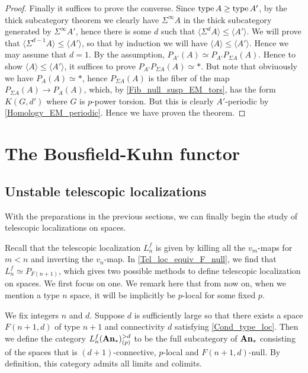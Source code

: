 \begin{proof}
		Finally it suffices to prove the converse. Since $\operatorname{\mathrm{type}} A\geq\operatorname{\mathrm{type}} A'$, by the thick subcategory theorem we clearly have $\Sigma^\infty A$ in the thick subcategory generated by $\Sigma^\infty A'$, hence there is some $d$ such that $\langle\Sigma^dA\rangle\leq\langle A'\rangle$. We will prove that $\langle\Sigma^{d-1}A\rangle\leq\langle A'\rangle$, so that by induction we will have $\langle A\rangle\leq\langle A'\rangle$. Hence we may assume that $d=1$. By the assumption, $P_{A'}(A)\simeq P_{A'}P_{\Sigma A}(A)$. Hence to show $\langle A\rangle\leq\langle A'\rangle$, it suffices to prove $P_{A'}P_{\Sigma A}(A)\simeq*$. But note that obviuously we have $P_A(A)\simeq*$, hence $P_{\Sigma A}(A)$ is the fiber of the map $P_{\Sigma A}(A)\to P_A(A)$, which, by \cref{Fib_null_susp_EM_tors}, has the form $K(G,d')$ where $G$ is $p$-power torsion. But this is clearly $A'$-periodic by \cref{Homology_EM_periodic}. Hence we have proven the theorem. 
	\end{proof}

\chapter{The Bousfield-Kuhn functor}

\section{Unstable telescopic localizations}

	With the preparations in the previous sections, we can finally begin the study of telescopic localizations on spaces. 

	Recall that the telescopic localization $L_n^f$ is given by killing all the $v_m$-maps for $m<n$ and inverting the $v_n$-map. In \cref{Tel_loc_equiv_F_null}, we find that $L_n^f\simeq P_{F(n+1)}$, which gives two possible methods to define telescopic localization on spaces. We first focus on one. We remark here that from now on, when we mention a type $n$ space, it will be implicitly be $p$-local for some fixed $p$. 

	\begin{defn}
		We fix integers $n$ and $d$. Suppose $d$ is sufficiently large so that there exists a space $F(n+1,d)$ of type $n+1$ and connectivity $d$ satisfying \cref{Cond_type_loc}. Then we define the category $L_n^f(\mathbf{An}_*)_{(p)}^{>d}$ to be the full subcategory of $\mathbf{An}_*$ consisting of the spaces that is $(d+1)$-connective, $p$-local and $F(n+1,d)$-null. By definition, this category admits all limits and colimits. 
	\end{defn}

